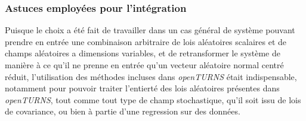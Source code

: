 \documentclass[a4paper,10pt]{article}
\begin{document}
\subsubsection{Astuces employées pour l'intégration}
Puisque le choix a été fait de travailler dans un cas général de système pouvant prendre en entrée une combinaison arbitraire de lois aléatoires scalaires et de champs aléatoires a dimensions variables, et de retransformer le système de manière à ce qu'il ne prenne en entrée qu'un vecteur aléatoire normal centré réduit, l'utilisation des méthodes incluses dans \textit{openTURNS} était indispensable, notamment pour pouvoir traiter l'entierté des lois aléatoires présentes dans \textit{openTURNS}, tout comme tout type de champ stochastique, qu'il soit issu de lois de covariance, ou bien à partie d'une regression sur des données.
\end{document}
